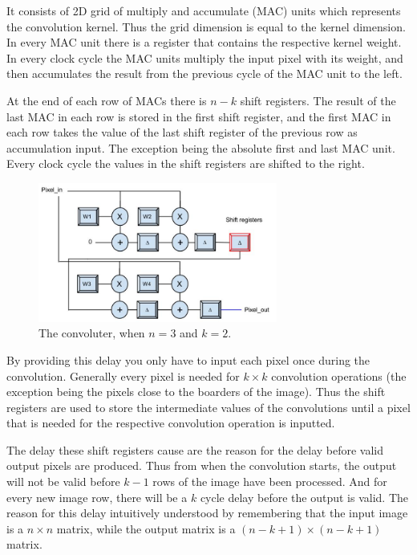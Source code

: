 It consists of 2D grid of multiply and accumulate (MAC) units which represents the convolution kernel. Thus the grid dimension is equal to the kernel dimension. In every MAC unit there is a register that contains the respective kernel weight. In every clock cycle the MAC units multiply the input pixel with its weight, and then accumulates the result from the previous cycle of the MAC unit to the left. 

At the end of each row of MACs there is $ n - k $ shift registers. The result of the last MAC in each row is stored in the first shift register, and the first MAC in each row takes the value of the last shift register of the previous row as accumulation input. The exception being the absolute first and last MAC unit. Every clock cycle the values in the shift registers are shifted to the right. 

\begin{figure}[h!]
  \centering
      \includegraphics[width=0.7\textwidth]{Figures/Method/Convolver}
  \caption[The convoluter ]{The convoluter, when $ n = 3 $ and $ k = 2 $.}
\end{figure}
	
By providing this delay you only have to input each pixel once during the convolution. Generally every pixel is needed for $ k \times k $ convolution operations (the exception being the pixels close to the boarders of the image). Thus the shift registers are used to store the intermediate values of the convolutions until a pixel that is needed for the respective convolution operation is inputted. 

The delay these shift registers cause are the reason for the delay before valid output pixels are produced. Thus from when the convolution starts, the output will not be valid before $ k-1 $ rows of the image have been processed. And for every new image row, there will be a $ k $ cycle delay before the output is valid. The reason for this delay intuitively understood by remembering that the input image is a $ n \times n $ matrix, while the output matrix is a $ (n-k+1) \times (n-k+1) $ matrix. 

